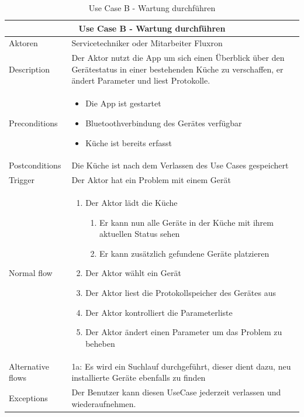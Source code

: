 \begin{table}[H]
\begin{tabular}{|p{3cm}|p{10cm}|}
  \hline
  \multicolumn{2}{|c|}{Use Case B - Wartung durchführen}
  \\\hline
  	Aktoren
  &
  	Servicetechniker oder Mitarbeiter Fluxron
  \\\hline
  	Description 
  &
  	Der Aktor nutzt die App um sich einen Überblick über den Gerätestatus in einer bestehenden Küche zu verschaffen, er ändert Parameter und liest Protokolle.
  \\\hline
  	Preconditions 
  & 
  	\begin{itemize}
	  \item Die App ist gestartet
	  \item Bluetoothverbindung des Gerätes verfügbar
	  \item Küche ist bereits erfasst
  	\end{itemize}
  \\\hline
  	Postconditions
  &
    Die Küche ist nach dem Verlassen des Use Cases gespeichert
  \\\hline
  	Trigger
  &
    Der Aktor hat ein Problem mit einem Gerät
  \\\hline
  	Normal flow
  &
	\begin{enumerate}
	  \item Der Aktor lädt die Küche
      \begin{enumerate}
    	\item Er kann nun alle Geräte in der Küche mit ihrem aktuellen Status sehen
	    \item Er kann zusätzlich gefundene Geräte platzieren
	  \end{enumerate}
	  \item Der Aktor wählt ein Gerät
      \item Der Aktor liest die Protokollspeicher des Gerätes aus
      \item Der Aktor kontrolliert die Parameterliste
      \item Der Aktor ändert einen Parameter um das Problem zu beheben
	\end{enumerate}
  \\\hline
    Alternative flows
  &
  1a: Es wird ein Suchlauf durchgeführt, dieser dient dazu, neu installierte Geräte ebenfalls zu finden
  \\\hline
    Exceptions
  &
    Der Benutzer kann diesen UseCase jederzeit verlassen und wiederaufnehmen.
  \\\hline
\end{tabular}
\caption{Use Case B - Wartung durchführen}
\end{table}

